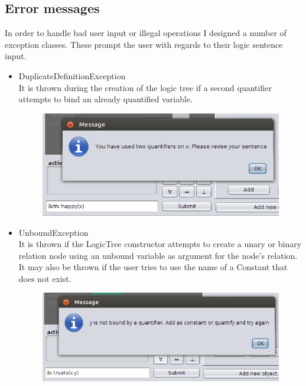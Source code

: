 \documentclass{report}
\begin{document}
\subsection{Error messages}
In order to handle bad user input or illegal operations I designed a number of 
exception classes. These prompt the user with regards to their logic sentence 
input.

\begin{itemize}
\item DuplicateDefinitionException\\
It is thrown during the creation of the logic tree if a second quantifier 
attempts to bind an already quantified variable.
\begin{figure}[h!]
\centering \includegraphics[scale=0.6]{duplicate.png}
\end{figure}

\item UnboundException\\
It is thrown if the LogicTree constructor attempts to create a unary or binary 
relation node using an unbound variable as argument for the node's relation. It 
may also be thrown if the user tries to use the name of a Constant that does not 
exist.
\newpage
\begin{figure}[h!]
\centering \includegraphics[scale=0.6]{unbound.png}
\end{figure}


\end{itemize}
\end{document}
